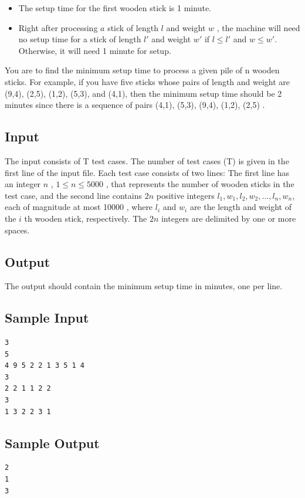 \documentclass{report}
\begin{document}
\begin{itemize}
    \item The setup time for the first wooden stick is 1 minute.
    \item Right after processing $a$ stick of length $l$ and weight $w$ , the machine will need no setup time for a stick of length $l'$ and weight $w'$ if $l \leq l'$ and $w \leq w'$. Otherwise, it will need 1 minute for setup.
\end{itemize}

You are to find the minimum setup time to process a given pile of n wooden sticks. For example, if you have five sticks whose pairs of length and weight are (9,4), (2,5), (1,2), (5,3), and (4,1), then the minimum setup time should be 2 minutes since there is a sequence of pairs (4,1), (5,3), (9,4), (1,2), (2,5) .\par

\subsection{Input}
The input consists of T test cases. The number of test cases (T) is given in the first line of the input file. Each test case consists of two lines: The first line has an integer $n$ , $1 \leq n \leq 5000$ , that represents the number of wooden sticks in the test case, and the second line contains $2n$ positive integers $l_1, w_1, l_2, w_2, ..., l_n, w_n$, each of magnitude at most 10000 , where $l_i$ and $w_i$ are the length and weight of the $i$ th wooden stick, respectively. The $2n$ integers are delimited by one or more spaces. \par

\subsection{Output}
The output should contain the minimum setup time in minutes, one per line. \par

\subsection{Sample Input}
\begin{lstlisting}
3
5
4 9 5 2 2 1 3 5 1 4
3
2 2 1 1 2 2
3
1 3 2 2 3 1
\end{lstlisting}

\subsection{Sample Output}
\begin{lstlisting}
2
1
3
\end{lstlisting}
\end{document}
